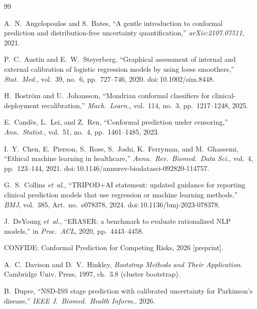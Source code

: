 \documentclass[11pt]{article}
\begin{document}
\begin{thebibliography}{99}

A.~N.~Angelopoulos and S.~Bates, ``A gentle introduction to conformal prediction and distribution-free uncertainty quantification,'' \textit{arXiv:2107.07511}, 2021.

P.~C.~Austin and E.~W.~Steyerberg, ``Graphical assessment of internal and external calibration of logistic regression models by using loess smoothers,'' \textit{Stat.\ Med.}, vol.~39, no.~6, pp.~727--746, 2020. doi:\,10.1002/sim.8448.

H.~Bostr\"{o}m and U.~Johansson, ``Mondrian conformal classifiers for clinical-deployment recalibration,'' \textit{Mach.\ Learn.}, vol.~114, no.~3, pp.~1217--1248, 2025.

E.~Cand\`{e}s, L.~Lei, and Z.~Ren, ``Conformal prediction under censoring,'' \textit{Ann.\ Statist.}, vol.~51, no.~4, pp.~1461--1485, 2023.

I.~Y.~Chen, E.~Pierson, S.~Rose, S.~Joshi, K.~Ferryman, and M.~Ghassemi, ``Ethical machine learning in healthcare,'' \textit{Annu.\ Rev.\ Biomed.\ Data Sci.}, vol.~4, pp.~123--144, 2021. doi:\,10.1146/annurev-biodatasci-092820-114757.

G.~S.~Collins \textit{et~al.}, ``TRIPOD+AI statement: updated guidance for reporting clinical prediction models that use regression or machine learning methods,'' \textit{BMJ}, vol.~385, Art.\ no.\ e078378, 2024. doi:\,10.1136/bmj-2023-078378.

J.~DeYoung \textit{et~al.}, ``ERASER: a benchmark to evaluate rationalized NLP models,'' in \textit{Proc.\ ACL}, 2020, pp.~4443--4458.

CONFIDE: Conformal Prediction for Competing Risks, 2026 [preprint].

A.~C.~Davison and D.~V.~Hinkley, \textit{Bootstrap Methods and Their Application}. Cambridge Univ. Press, 1997, ch.~3.8 (cluster bootstrap).

B.~Dupre, ``NSD-ISS stage prediction with calibrated uncertainty for Parkinson's disease,'' \textit{IEEE J.\ Biomed.\ Health Inform.}, 2026.


\end{thebibliography}
\end{document}
